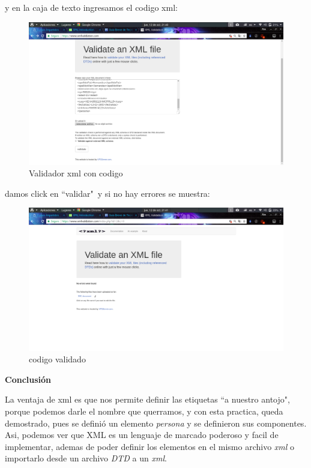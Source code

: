 \documentclass[12pt,letterpaper]{article}
\begin{document}
y en la caja de texto ingresamos el codigo xml:

\begin{center}
\begin{figure}[h]
\includegraphics[width=400pt]{./imgs/codigo.png}
\vspace{-2mm}
\caption{Validador xml con codigo}\label{figure 1}
\end{figure}
\end{center}
\vspace{3mm}
\newpage

damos click en ``validar"\ y si no hay errores se muestra: 

\begin{center}
\begin{figure}[h]
\includegraphics[width=400pt]{./imgs/validado.png}
\vspace{-2mm}
\caption{codigo validado}\label{figure 1}
\end{figure}
\end{center}

\newpage
{\Huge {\rm {\bf Conclusi\'on}}}

\vspace{5mm}
La ventaja de xml es que nos permite definir las etiquetas ``a nuestro antojo", porque podemos darle el nombre que querramos, y con esta practica, queda demostrado, pues se defini\'o un elemento {\em persona} y se definieron sus componentes.
\\Asi, podemos ver que XML es un lenguaje de marcado poderoso y facil de implementar, ademas de poder definir los elementos en el mismo archivo {\em xml} o importarlo desde un archivo {\em DTD} a un {\em xml}.


\end{document}

